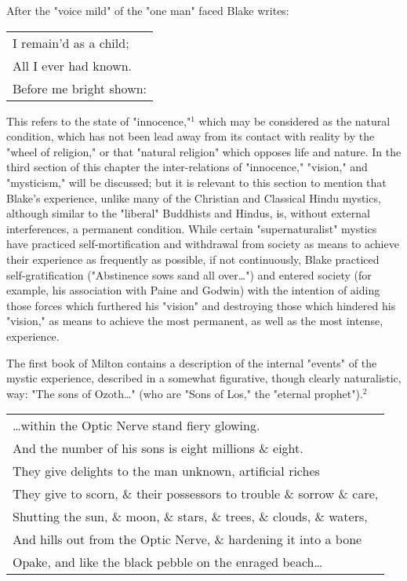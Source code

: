 After the "voice mild" of the "one man" faced Blake writes:\par
\begin{center}
	\parbox{0.8\textwidth}{
		\centering
		\begin{tabular}{l}
			I remain'd as a child;  \\
			All I ever had known.   \\
			Before me bright shown: \\
		\end{tabular}
	}%
\end{center}
\hspace*{5mm}This refers to the state of "innocence,"$^{1}$ which may be considered
as the natural condition, which has not been lead away from its contact
with reality by the "wheel of religion," or that "natural religion" which
opposes life and nature. In the third section of this chapter the inter-relations
of "innocence," "vision," and "mysticism," will be discussed; but it is relevant to
this section to mention that Blake's experience, unlike many of the Christian and Classical Hindu
mystics, although similar to the "liberal" Buddhists and Hindus, is, without external
interferences, a permanent condition. While certain "supernaturalist" mystics have practiced
self-mortification and withdrawal from society as means to achieve their experience as frequently
as possible, if not continuously, Blake practiced self-gratification ("Abstinence sows sand all over\dots")
and entered society (for example, his association with Paine and Godwin) with the intention
of aiding those forces which furthered his "vision" and destroying those which hindered his "vision,"
as means to achieve the most permanent, as well as the most intense, experience.\par
\vspace*{0.5\baselineskip}
The first book of Milton contains a description of the internal "events" of the mystic experience,
described in a somewhat figurative, though clearly naturalistic, way: "The sons of Ozoth\dots" (who are "Sons of Los,"
the "eternal prophet").$^{2}$\par
\begin{center}
	\parbox{0.8\textwidth}{
		\centering
		\begin{tabular}{l}
			\dots within the Optic Nerve stand fiery glowing.                     \\
			And the number of his sons is eight millions \& eight.                \\
			They give delights to the man unknown, artificial riches              \\
			They give to scorn, \& their possessors to trouble \& sorrow \& care, \\
			Shutting the sun, \& moon, \& stars, \& trees, \& clouds, \& waters,  \\
			And hills out from the Optic Nerve, \& hardening it into a bone       \\
			Opake, and like the black pebble on the enraged beach\dots
		\end{tabular}
	}%
\end{center}
